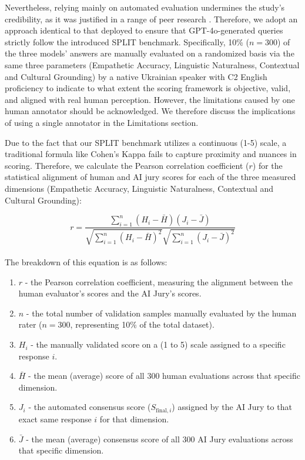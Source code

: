 \documentclass[10pt, twocolumn]{article}
\begin{document}
Nevertheless, relying mainly on automated evaluation undermines the study's credibility, as it was justified in a range of peer research \cite{chang2023surveyevaluationlargelanguage, park-etal-2025-polite}. Therefore, we adopt an approach identical to that deployed to ensure that GPT-4o-generated queries strictly follow the introduced SPLIT benchmark. Specifically, 10\% ($n=300$) of the three models' answers are manually evaluated on a randomized basis \cite{sim2005the} via the same three parameters (Empathetic Accuracy, Linguistic Naturalness, Contextual and Cultural Grounding) by a native Ukrainian speaker with C2 English proficiency to indicate to what extent the scoring framework is objective, valid, and aligned with real human perception. However, the limitations caused by one human annotator should be acknowledged. We therefore discuss the implications of using a single annotator in the Limitations section.

Due to the fact that our SPLIT benchmark utilizes a continuous (1-5) scale, a traditional formula like Cohen's Kappa \cite{cohen1960coefficient} fails to capture proximity and nuances in scoring. Therefore, we calculate the Pearson correlation coefficient ($r$) \cite{freitag-etal-2023-results} for the statistical alignment of human and AI jury scores for each of the three measured dimensions (Empathetic Accuracy, Linguistic Naturalness, Contextual and Cultural Grounding):

\begin{equation*}\label{eq:pearson}r = \frac{\sum_{i=1}^{n} (H_i - \bar{H})(J_i - \bar{J})}{\sqrt{\sum_{i=1}^{n} (H_i - \bar{H})^2} \sqrt{\sum_{i=1}^{n} (J_i - \bar{J})^2}}\end{equation*}
\\

The breakdown of this equation is as follows:

\begin{enumerate}
    \item $r$ - the Pearson correlation coefficient, measuring the alignment between the human evaluator's scores and the AI Jury's scores.
    \item $n$ - the total number of validation samples manually evaluated by the human rater ($n=300$, representing 10\% of the total dataset).
    \item $H_i$ - the manually validated score on a (1 to 5) scale assigned to a specific response $i$.
    \item $\bar{H}$ - the mean (average) score of all 300 human evaluations across that specific dimension.
    \item $J_i$ - the automated consensus score ($S_{\text{final}, i}$) assigned by the AI Jury to that exact same response $i$ for that dimension.
    \item $\bar{J}$ - the mean (average) consensus score of all 300 AI Jury evaluations across that specific dimension.
\end{enumerate}
\end{document}
